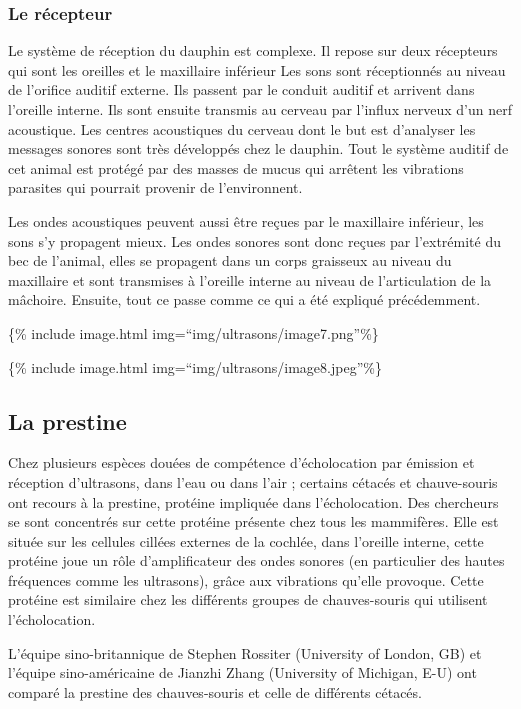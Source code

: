 \subsubsection{Le récepteur}\label{le-ruxe9cepteur}

Le système de réception du dauphin est complexe. Il repose sur deux
récepteurs qui sont les oreilles et le maxillaire inférieur Les sons
sont réceptionnés au niveau de l'orifice auditif externe. Ils passent
par le conduit auditif et arrivent dans l'oreille interne. Ils sont
ensuite transmis au cerveau par l'influx nerveux d'un nerf acoustique.
Les centres acoustiques du cerveau dont le but est d'analyser les
messages sonores sont très développés chez le dauphin. Tout le système
auditif de cet animal est protégé par des masses de mucus qui arrêtent
les vibrations parasites qui pourrait provenir de l'environnent.

Les ondes acoustiques peuvent aussi être reçues par le maxillaire
inférieur, les sons s'y propagent mieux. Les ondes sonores sont donc
reçues par l'extrémité du bec de l'animal, elles se propagent dans un
corps graisseux au niveau du maxillaire et sont transmises à l'oreille
interne au niveau de l'articulation de la mâchoire. Ensuite, tout ce
passe comme ce qui a été expliqué précédemment.

\{\% include image.html img=``img/ultrasons/image7.png''\%\}

\{\% include image.html img=``img/ultrasons/image8.jpeg''\%\}

\subsection{La prestine}\label{la-prestine}

Chez plusieurs espèces douées de compétence d'écholocation par émission
et réception d'ultrasons, dans l'eau ou dans l'air ; certains cétacés et
chauve-souris ont recours à la prestine, protéine impliquée dans
l'écholocation. Des chercheurs se sont concentrés sur cette protéine
présente chez tous les mammifères. Elle est située sur les cellules
cillées externes de la cochlée, dans l'oreille interne, cette protéine
joue un rôle d'amplificateur des ondes sonores (en particulier des
hautes fréquences comme les ultrasons), grâce aux vibrations qu'elle
provoque. Cette protéine est similaire chez les différents groupes de
chauves-souris qui utilisent l'écholocation.

L'équipe sino-britannique de Stephen Rossiter (University of London, GB)
et l'équipe sino-américaine de Jianzhi Zhang (University of Michigan,
E-U) ont comparé la prestine des chauves-souris et celle de différents
cétacés.

